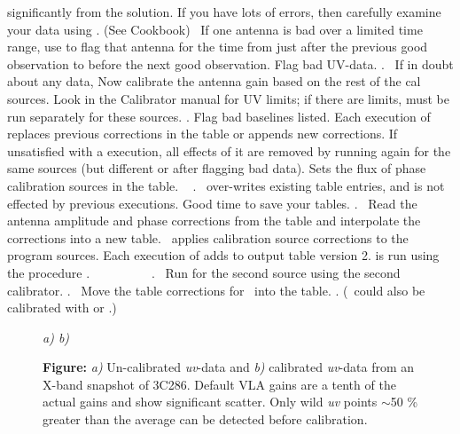 significantly from the solution.
If you have lots of errors, then
carefully examine your data using . (See \AIPS Cookbook)~
If one antenna is bad over a limited time range, use 
to flag that antenna for the time from just after the previous good
 observation to before the next good  observation.
 Flag bad UV-data.
.~
If in doubt about any data, 
 Now calibrate the antenna gain based on the
rest of the cal sources.
Look in the Calibrator manual for UV limits; if there are limits,
 must be run separately for these sources.
.
Flag bad baselines listed.  Each execution of  replaces
previous corrections in the \SN table or appends new corrections.
If unsatisfied with a  execution, all effects
of it are removed by running  again
for the same sources (but different 
or after flagging bad data).
 Sets the flux of phase calibration sources in the \SU table.
~
.~
 over-writes existing \SU table
entries, and is not effected by previous executions.
 Good time to save your tables.
.~
 Read the antenna amplitude and phase corrections from
the
\SN table and interpolate the corrections into a new \CL table.~
 applies calibration source corrections to the
program sources.
Each execution of  adds to output \CL table version 2.
 is run using the procedure .~
~ ~
~
~
~ .~
Run  for the second source using the second calibrator.
.~
Move the \SN table corrections for \TCTES\ into the \CL table.
.
(\TCTES\ could also be calibrated with  or .)
\eeddes
\clearpage

\begin{figure}[t]
\vskip 4in
{\it \hskip 1.5in a) \hfill b) \hskip 1.5in}

{\bf Figure:}
{\it a)} Un-calibrated {\it uv}-data and  {\it b)}
calibrated {\it uv}-data from an X-band snapshot of 3C286.
Default VLA gains are a tenth of the actual gains and
show significant scatter.
Only wild {\it uv} points $\sim$50 \% greater than the average
can be detected before calibration.
\end{figure}

